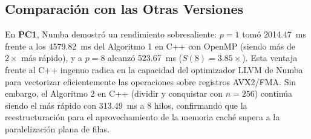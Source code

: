 \subsection{Comparación con las Otras Versiones}
En \textbf{PC1}, Numba demostró un rendimiento sobresaliente: $p=1$ tomó \SI{2014.47}{\milli\second} frente a los \SI{4579.82}{\milli\second} del Algoritmo 1 en C++ con OpenMP (siendo más de $2\times$ más rápido), y a $p=8$ alcanzó \SI{523.67}{\milli\second} ($S(8)=3.85\times$). Esta ventaja frente al C++ ingenuo radica en la capacidad del optimizador LLVM de Numba para vectorizar eficientemente las operaciones sobre registros AVX2/FMA. Sin embargo, el Algoritmo 2 en C++ (dividir y conquistar con $n=256$) continúa siendo el más rápido con \SI{313.49}{\milli\second} a 8 hilos, confirmando que la reestructuración para el aprovechamiento de la memoria caché supera a la paralelización plana de filas.
